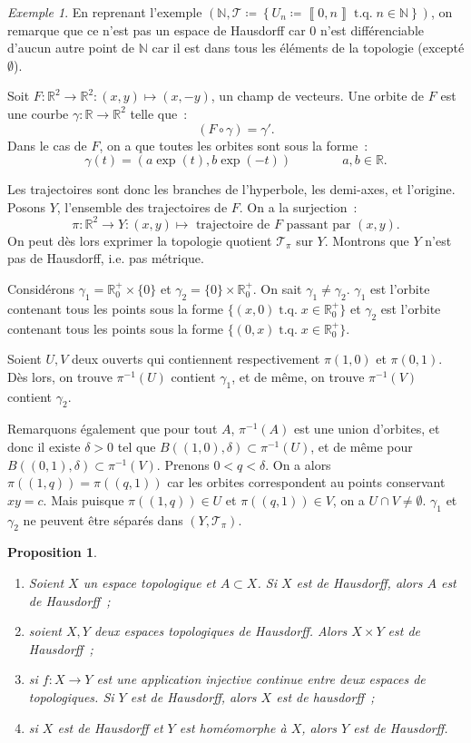 \documentclass{report}
\newtheorem{prp}[thm]{Proposition}
\theoremstyle{definition}
\theoremstyle{remark}
\newtheorem{ex}{Exemple}[chapter]
\DeclareMathOperator{\tq}{\text{ t.q. }}
\newcommand{\intint}[2]{\left\llbracket#1, #2\right\rrbracket}
\newcommand{\R}{\mathbb R}
\newcommand{\N}{\mathbb N}
\renewcommand{\top}{\mathcal T}
\begin{document}
	\begin{ex} En reprenant l'exemple $\left(\N, \top \coloneqq \left\{U_n \coloneqq \intint 0n \tq n \in \N\right\}\right)$, on remarque que ce n'est pas un espace de
	Hausdorff car $0$ n'est différenciable d'aucun autre point de $\N$ car il est dans tous les éléments de la topologie (excepté $\emptyset$).

	Soit $F : \R^2 \to \R^2 : (x, y) \mapsto (x, -y)$, un champ de vecteurs. Une orbite de $F$ est une courbe $\gamma : \R \to \R^2$ telle que~:
	\[(F \circ \gamma) = \gamma'.\]
	Dans le cas de $F$, on a que toutes les orbites sont sous la forme~:
	\[\gamma(t) = (a\exp(t), b\exp(-t))\qquad\qquad a, b \in \R.\]

	Les trajectoires sont donc les branches de l'hyperbole, les demi-axes, et l'origine. Posons $Y$, l'ensemble des trajectoires de $F$. On a la surjection~:
	\[\pi : \R^2 \to Y : (x, y) \mapsto \text{ trajectoire de $F$ passant par $(x, y)$}.\]
	On peut dès lors exprimer la topologie quotient $\top_\pi$ sur $Y$. Montrons que $Y$ n'est pas de Hausdorff, i.e. pas métrique.

	Considérons $\gamma_1 = \R^+_0 \times \{0\}$ et $\gamma_2 = \{0\} \times \R^+_0$. On sait $\gamma_1 \neq \gamma_2$. $\gamma_1$ est l'orbite contenant tous les
	points sous la forme $\{(x, 0) \tq x \in \R^+_0\}$ et $\gamma_2$ est l'orbite contenant tous les points sous la forme $\{(0, x) \tq x \in \R^+_0\}$.

	Soient $U, V$ deux ouverts qui contiennent respectivement $\pi(1, 0)$ et $\pi(0, 1)$. Dès lors, on trouve $\pi^{-1}(U)$ contient $\gamma_1$, et de même, on
	trouve $\pi^{-1}(V)$ contient $\gamma_2$.

	Remarquons également que pour tout $A$, $\pi^{-1}(A)$ est une union d'orbites, et donc il existe $\delta > 0$ tel que $B((1, 0), \delta) \subset \pi^{-1}(U)$, et de
	même pour $B((0, 1), \delta) \subset \pi^{-1}(V)$. Prenons $0 < q < \delta$. On a alors $\pi((1, q)) = \pi((q, 1))$ car les orbites correspondent au points
	conservant $xy = c$. Mais puisque $\pi((1, q)) \in U$ et $\pi((q, 1)) \in V$, on a $U \cap V \neq \emptyset$. $\gamma_1$ et $\gamma_2$ ne peuvent être séparés
	dans $(Y, \top_\pi)$.
	\end{ex}

	\begin{prp}~
	\begin{enumerate}
		\item Soient $X$ un espace topologique et $A \subset X$. Si $X$ est de Hausdorff, alors $A$ est de Hausdorff~;
		\item soient $X, Y$ deux espaces topologiques de Hausdorff. Alors $X \times Y$ est de Hausdorff~;
		\item si $f : X \to Y$ est une application injective continue entre deux espaces de topologiques. Si $Y$ est de Hausdorff, alors $X$ est de hausdorff~;
		\item si $X$ est de Hausdorff et $Y$ est homéomorphe à $X$, alors $Y$ est de Hausdorff.
	\end{enumerate}
	\end{prp}
\end{document}
